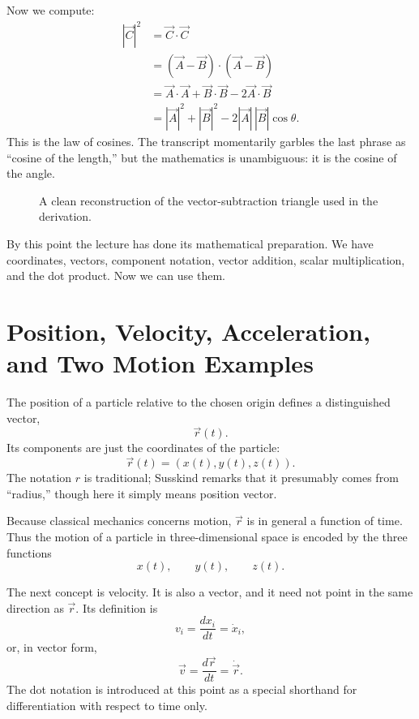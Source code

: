 Now we compute:
\begin{align}
|\vec C|^2
  &= \vec C\cdot\vec C \\
  &= (\vec A-\vec B)\cdot(\vec A-\vec B) \\
  &= \vec A\cdot\vec A+\vec B\cdot\vec B-2\vec A\cdot\vec B \\
  &= |\vec A|^2+|\vec B|^2-2|\vec A|\,|\vec B|\cos\theta.
\end{align}
This is the law of cosines. The transcript momentarily garbles the last phrase as ``cosine of the length,'' but the mathematics is unambiguous: it is the cosine of the angle.

\begin{figure}
\centering
{}
\caption{A clean reconstruction of the vector-subtraction triangle used in the derivation.}
\end{figure}

By this point the lecture has done its mathematical preparation. We have coordinates, vectors, component notation, vector addition, scalar multiplication, and the dot product. Now we can use them.

\section{Position, Velocity, Acceleration, and Two Motion Examples}

The position of a particle relative to the chosen origin defines a distinguished vector,
\[
\vec r(t).
\]
Its components are just the coordinates of the particle:
\[
\vec r(t)=(x(t),y(t),z(t)).
\]
The notation \(r\) is traditional; Susskind remarks that it presumably comes from ``radius,'' though here it simply means position vector.

Because classical mechanics concerns motion, \(\vec r\) is in general a function of time. Thus the motion of a particle in three-dimensional space is encoded by the three functions
\[
x(t),\qquad y(t),\qquad z(t).
\]

The next concept is velocity. It is also a vector, and it need not point in the same direction as \(\vec r\). Its definition is
\begin{equation}
v_i=\frac{dx_i}{dt}=\dot x_i,
\end{equation}
or, in vector form,
\begin{equation}
\vec v=\frac{d\vec r}{dt}=\dot{\vec r}.
\end{equation}
The dot notation is introduced at this point as a special shorthand for differentiation with respect to time only.

